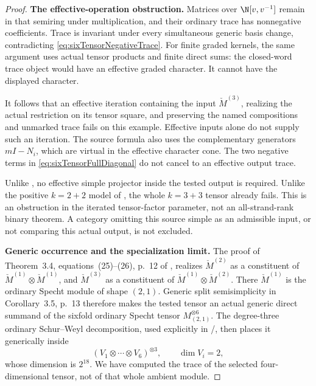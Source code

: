 \begin{proof}
\par\smallskip\noindent\textbf{The effective-operation obstruction.}\quad
Matrices over \(\N[v,v^{-1}]\) remain in that
semiring under multiplication, and their ordinary
trace has nonnegative coefficients.
Trace is invariant under every simultaneous
generic basis change, contradicting
\eqref{eq:sixTensorNegativeTrace}.
For finite graded kernels, the same argument
uses actual tensor products and finite direct
sums: the closed-word trace object would have
an effective graded character. It cannot have
the displayed character.

It follows that an effective iteration containing
the input \(\check M^{(3)}\), realizing the actual
restriction on its tensor square, and preserving
the named compositions and unmarked trace fails
on this example. Effective inputs alone do not
supply such an iteration. The source formula
also uses the complementary generators \(mI-N_i\),
which are virtual in the effective character cone.
The two negative terms in
\eqref{eq:sixTensorFullDiagonal} do not cancel
to an effective output trace.

Unlike , no effective simple projector
inside the tested output is required.
Unlike the positive \(k=2+2\) model of ,
the whole \(k=3+3\) tensor already fails.
This is an obstruction in the iterated tensor-factor
parameter, not an all-strand-rank binary theorem.
A category omitting this source simple as an
admissible input, or not comparing this actual
output, is not excluded.

\par\smallskip\noindent\textbf{Generic occurrence and the specialization limit.}\quad
The proof of Theorem~3.4, equations~(25)--(26),
p.~12 of \cite{BlasiakChebyshev}, realizes
\(\check M^{(2)}\) as a constituent of
\(\check M^{(1)}\otimes\check M^{(1)}\), and
\(\check M^{(3)}\) as a constituent of
\(\check M^{(1)}\otimes\check M^{(2)}\).
There \(\check M^{(1)}\) is the ordinary
Specht module of shape \((2,1)\).
Generic split semisimplicity in Corollary~3.5,
p.~13 therefore makes the tested tensor an
actual generic direct summand of the sixfold
ordinary Specht tensor \(M_{(2,1)}^{\otimes6}\).
The degree-three ordinary Schur--Weyl decomposition,
used explicitly in /, then
places it generically inside
\[
 (V_1\otimes\cdots\otimes V_6)^{\otimes3},
          \qquad \dim V_i=2,
\]
whose dimension is \(2^{18}\).
We have computed the trace of the selected
four-dimensional tensor, not of that whole
ambient module.


\end{proof}
